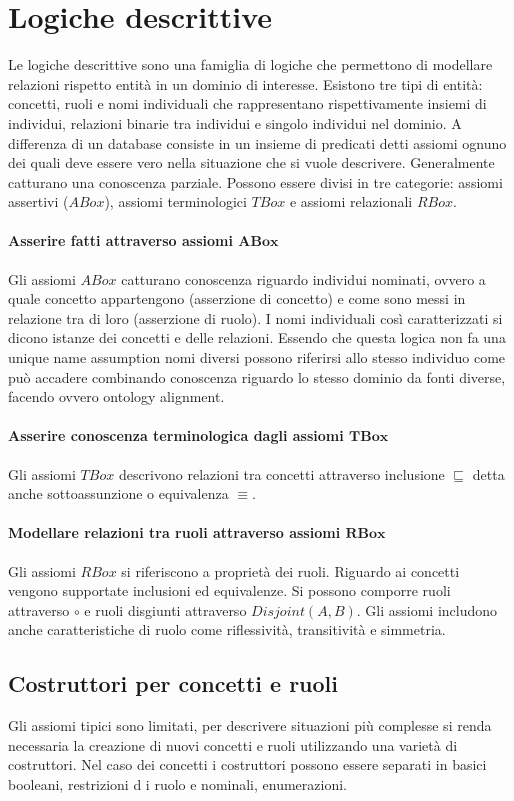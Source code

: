 \chapter{Logiche descrittive}
Le logiche descrittive sono una famiglia di logiche che permettono di modellare relazioni rispetto entit\`a in un dominio di interesse. Esistono tre tipi di entit\`a: concetti, ruoli e nomi individuali che 
rappresentano rispettivamente insiemi di individui, relazioni binarie tra individui e singolo individui nel dominio. A differenza di un database consiste in un insieme di predicati detti assiomi ognuno dei quali deve
essere vero nella situazione che si vuole descrivere. Generalmente catturano una conoscenza parziale. Possono essere divisi in tre categorie: assiomi assertivi ($ABox$), assiomi terminologici $TBox$ e 
assiomi relazionali $RBox$.
\subsubsection{Asserire fatti attraverso assiomi $\mathbf{ABox}$}
Gli assiomi $ABox$ catturano conoscenza riguardo individui nominati, ovvero a quale concetto appartengono (asserzione di concetto) e come sono messi in relazione tra di loro (asserzione di ruolo). I nomi 
individuali cos\`i caratterizzati si dicono istanze dei concetti e delle relazioni. Essendo che questa logica non fa una unique name assumption nomi diversi possono riferirsi allo stesso individuo come pu\`o 
accadere combinando conoscenza riguardo lo stesso dominio da fonti diverse, facendo ovvero ontology alignment.
\subsubsection{Asserire conoscenza terminologica dagli assiomi $\mathbf{TBox}$}
Gli assiomi $TBox$ descrivono relazioni tra concetti attraverso inclusione $\sqsubseteq$ detta anche sottoassunzione o equivalenza $\equiv$. 
\subsubsection{Modellare relazioni tra ruoli attraverso assiomi $\mathbf{RBox}$}
Gli assiomi $RBox$ si riferiscono a propriet\`a dei ruoli. Riguardo ai concetti vengono supportate inclusioni ed equivalenze. Si possono comporre ruoli attraverso $\circ$ e ruoli disgiunti attraverso
$Disjoint(A,B)$. Gli assiomi includono anche caratteristiche di ruolo come riflessivit\`a, transitivit\`a e simmetria.
\section{Costruttori per concetti e ruoli}
Gli assiomi tipici sono limitati, per descrivere situazioni pi\`u complesse si renda necessaria la creazione di nuovi concetti e ruoli utilizzando una variet\`a di costruttori. Nel caso dei concetti i costruttori possono
essere separati in basici booleani, restrizioni d
i ruolo e nominali, enumerazioni.
